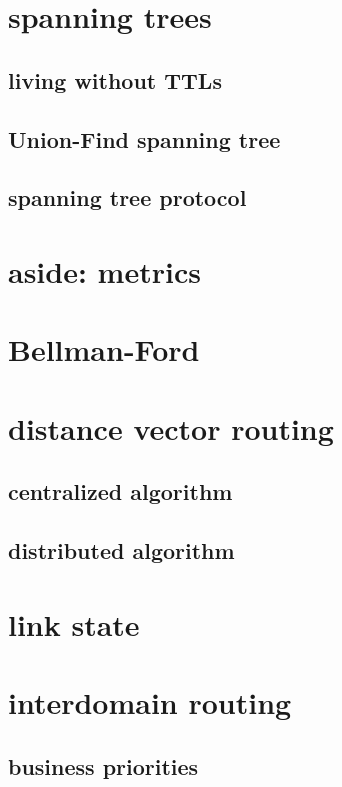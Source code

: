 \section{spanning trees}

\subsection{living without TTLs}

\subsection{Union-Find spanning tree}

\subsection{spanning tree protocol}

\section{aside: metrics}

\section{Bellman-Ford}

\section{distance vector routing}

\subsection{centralized algorithm}

\subsection{distributed algorithm}

\section{link state}

\section{interdomain routing}

\subsection{business priorities}


